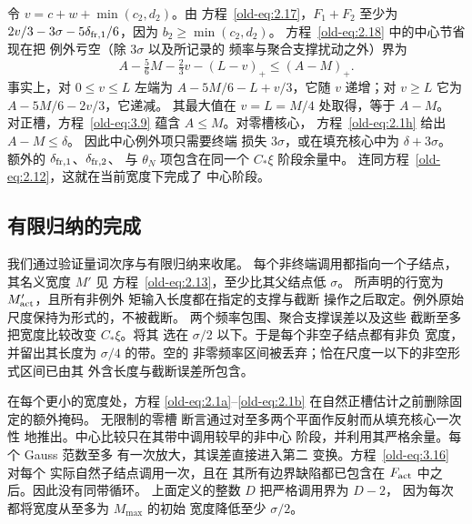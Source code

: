 \documentclass[11pt,a4paper]{article}
\numberwithin{equation}{section}
\numberwithin{figure}{section}
\theoremstyle{definition}
\theoremstyle{remark}
\begin{document}
令 \(v=c+w+\min(c_2,d_2)\)。由
方程~\eqref{old-eq:2.17}，\(F_1+F_2\) 至少为
\(2v/3-3\sigma-5\delta_{{\rm fr},1}/6\)，因为
\(b_2\ge\min(c_2,d_2)\)。
方程~\eqref{old-eq:2.18} 中的中心节省现在把
例外亏空（除 \(3\sigma\) 以及所记录的
频率与聚合支撑扰动之外）界为
\begin{equation}
 A-\tfrac56M-\tfrac23v-(L-v)_+
 \le (A-M)_+.
 \label{old-eq:2.19}
\end{equation}
事实上，对 \(0\le v\le L\) 左端为
\(A-5M/6-L+v/3\)，它随 \(v\) 递增；对
\(v\ge L\) 它为 \(A-5M/6-2v/3\)，它递减。
其最大值在 \(v=L=M/4\) 处取得，等于 \(A-M\)。
对正槽，方程~\eqref{old-eq:3.9} 蕴含
\(A\le M\)。对零槽核心，
方程~\eqref{old-eq:2.1h} 给出 \(A-M\le\delta\)。
因此中心例外项只需要终端
损失 \(3\sigma\)，或在填充核心中为 \(\delta+3\sigma\)。
额外的 \(\delta_{{\rm fr},1}\)、\(\delta_{{\rm fr},2}\)、
与 \(\theta_N\) 项包含在同一个 \(C_*\xi\)
阶段余量中。
连同方程~\eqref{old-eq:2.12}，这就在当前宽度下完成了
中心阶段。

\subsection{有限归纳的完成}

我们通过验证量词次序与有限归纳来收尾。
每个非终端调用都指向一个子结点，其名义宽度 \(M'\) 见
方程~\eqref{old-eq:2.13}，至少比其父结点低 \(\sigma\)。
所声明的行宽为 \(M'_{\rm act}\)，且所有非例外
矩输入长度都在指定的支撑与截断
操作之后取定。例外原始尺度保持为形式的，不被截断。
两个频率包围、聚合支撑误差以及这些
截断至多把宽度比较改变 \(C_*\xi\)。将其
选在 \(\sigma/2\) 以下。于是每个非空子结点都有非负
宽度，并留出其长度为 \(\sigma/4\) 的带。空的
非零频率区间被丢弃；恰在尺度一以下的非空形式区间已由其
外含长度与截断误差所包含。

在每个更小的宽度处，方程
\eqref{old-eq:2.1a}--\eqref{old-eq:2.1b} 在自然正槽估计之前删除固定的额外掩码。
无限制的零槽
断言通过对至多两个平面作反射而从填充核心一次性
地推出。中心比较只在其带中调用较早的非中心
阶段，并利用其严格余量。每个 Gauss 范数至多
有一次放大，其误差直接进入第二
变换。方程~\eqref{old-eq:3.16} 对每个
实际自然子结点调用一次，且在
其所有边界缺陷都已包含在 \(F_{\rm act}\) 中之后。因此没有同带循环。
上面定义的整数 \(D\) 把严格调用界为 \(D-2\)，
因为每次都将宽度从至多为 \(M_{\max}\) 的初始
宽度降低至少 \(\sigma/2\)。
\end{document}
